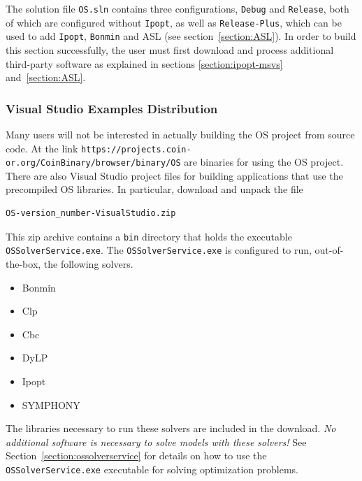 \documentclass[11pt]{article}
\renewcommand{\_}{{\char"5F}}
\renewcommand{\{}{{\char"7B}}
\renewcommand{\}}{{\char"7D}}
\renewcommand{\^}{{\char"0D}}
\renewcommand{\'}{{\char"0D}}
\newif\ifipopt  \ipopttrue      %
\newcommand{\UrlOsWin}{https://projects.coin-or.org/CoinBinary/browser/binary/OS}
\begin{document}
\ifipopt
The solution file {\tt OS.sln} contains three configurations, 
{\tt Debug} and 
{\tt Release}, 
both of which are configured without {\tt Ipopt}, as well as 
{\tt Release-Plus},
which can be used to add {\tt Ipopt}, 
{\tt Bonmin} and ASL
(see section~\ref{section:ASL}). In order to build this section successfully,
the user must first download and process additional third-party software as explained in 
sections \ref{section:ipopt-msvs} and~\ref{section:ASL}.
\fi


\subsubsection{Visual Studio Examples Distribution}\label{section:vsexamples}

Many users will not be interested in actually building the OS project from source code.   At the link
{\tt\UrlOsWin} are  binaries for using the OS project.
There are also Visual Studio project files for building applications that use the precompiled OS libraries.
In particular, download and unpack the file

\begin{verbatim}
OS-version_number-VisualStudio.zip
\end{verbatim}

This zip archive contains a  {\tt bin} directory that holds  the executable  {\tt OSSolverService.exe}.
The {\tt OSSolverService.exe} is configured to run, out-of-the-box,   the following solvers.

\begin{itemize}

\item Bonmin

\item Clp

\item Cbc

\item DyLP

\item Ipopt

\item SYMPHONY

\end{itemize}
The libraries necessary to run these solvers are included in the download.  {\it No additional software is necessary
to solve models with these solvers!}   See Section~\ref{section:ossolverservice} for details on how to use the
{\tt OSSolverService.exe} executable for solving optimization problems.
\end{document}

